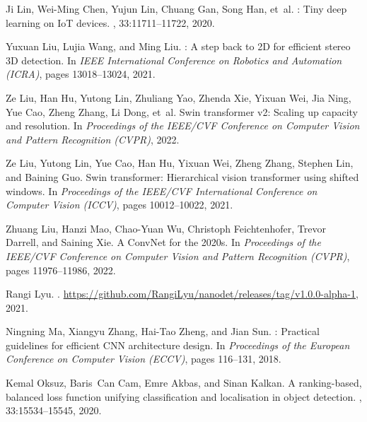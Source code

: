 \documentclass[10pt,twocolumn,letterpaper]{article}
\begin{document}
{\begin{thebibliography}{100}
				Ji Lin, Wei-Ming Chen, Yujun Lin, Chuang Gan, Song Han, et~al.
				: Tiny deep learning on {IoT} devices.
				,
				33:11711--11722, 2020.
				
				Yuxuan Liu, Lujia Wang, and Ming Liu.
				: A step back to {2D} for efficient stereo {3D}
				detection.
				\newblock In {\em IEEE International Conference on Robotics and Automation
					(ICRA)}, pages 13018--13024, 2021.
				
				Ze Liu, Han Hu, Yutong Lin, Zhuliang Yao, Zhenda Xie, Yixuan Wei, Jia Ning, Yue
				Cao, Zheng Zhang, Li Dong, et~al.
				\newblock Swin transformer v2: Scaling up capacity and resolution.
				\newblock In {\em Proceedings of the IEEE/CVF Conference on Computer Vision and
					Pattern Recognition (CVPR)}, 2022.
				
				Ze Liu, Yutong Lin, Yue Cao, Han Hu, Yixuan Wei, Zheng Zhang, Stephen Lin, and
				Baining Guo.
				\newblock Swin transformer: Hierarchical vision transformer using shifted
				windows.
				\newblock In {\em Proceedings of the IEEE/CVF International Conference on
					Computer Vision (ICCV)}, pages 10012--10022, 2021.
				
				Zhuang Liu, Hanzi Mao, Chao-Yuan Wu, Christoph Feichtenhofer, Trevor Darrell,
				and Saining Xie.
				\newblock A {ConvNet} for the 2020s.
				\newblock In {\em Proceedings of the IEEE/CVF Conference on Computer Vision and
					Pattern Recognition (CVPR)}, pages 11976--11986, 2022.
				
				Rangi Lyu.
				.
				\newblock
				\url{https://github.com/RangiLyu/nanodet/releases/tag/v1.0.0-alpha-1}, 2021.
				
				Ningning Ma, Xiangyu Zhang, Hai-Tao Zheng, and Jian Sun.
				: Practical guidelines for efficient {CNN}
				architecture design.
				\newblock In {\em Proceedings of the European Conference on Computer Vision
					(ECCV)}, pages 116--131, 2018.
				
				Kemal Oksuz, Baris~Can Cam, Emre Akbas, and Sinan Kalkan.
				\newblock A ranking-based, balanced loss function unifying classification and
				localisation in object detection.
				,
				33:15534--15545, 2020.
				

\end{thebibliography}}
\end{document}
